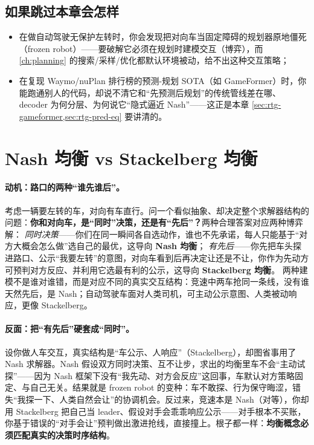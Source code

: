 \subsection*{如果跳过本章会怎样}
\begin{itemize}
  \item 在做自动驾驶无保护左转时，你会发现把对向车当固定障碍的规划器原地僵死（frozen robot）——要破解它必须在规划时建模交互（博弈），而 \cref{ch:planning} 的搜索/采样/优化都默认环境被动，给不出这种交互策略；
  \item 在复现 Waymo/nuPlan 排行榜的预测-规划 SOTA（如 GameFormer）时，你能跑通别人的代码，却说不清它和“先预测后规划”的传统管线差在哪、decoder 为何分层、为何说它“隐式逼近 Nash”——这正是本章 \cref{sec:rtg-gameformer,sec:rtg-pred-eq} 要讲清的。
\end{itemize}

\section{Nash 均衡 vs Stackelberg 均衡}
\label{sec:rtg-concept}

\paragraph{动机：路口的两种“谁先谁后”。}
考虑一辆要左转的车，对向有车直行。问一个看似抽象、却决定整个求解器结构的问题：\textbf{你和对向车，是“同时”决策，还是有“先后”？}两种合理答案对应两种博弈解\cite{sadigh2016planning}：
\emph{同时决策}——你们在同一瞬间各自选动作，谁也不先承诺，每人只能基于“对方大概会怎么做”选自己的最优，这导向 \textbf{Nash 均衡}；
\emph{有先后}——你先把车头探进路口、公示“我要左转”的意图，对向车看到后再决定让还是不让，你作为先动方可预判对方反应、并利用它选最有利的公示，这导向 \textbf{Stackelberg 均衡}。
两种建模不是谁对谁错，而是对应不同的真实交互结构：竞速中两车抢同一条线，没有谁天然先后，是 Nash；自动驾驶车面对人类司机，可主动公示意图、人类被动响应，更像 Stackelberg。

\paragraph{反面：把“有先后”硬套成“同时”。}
设你做人车交互，真实结构是“车公示、人响应”（Stackelberg），却图省事用了 Nash 求解器。Nash 假设双方同时决策、互不让步，求出的均衡里车不会“主动试探”——因为 Nash 框架下没有“我先动、对方会反应”这回事，车默认对方策略固定、与自己无关。结果就是 frozen robot 的变种：车不敢探、行为保守晦涩，错失“我探一下、人类自然会让”的协调机会。反过来，竞速本是 Nash（对等），你却用 Stackelberg 把自己当 leader、假设对手会乖乖响应公示——对手根本不买账，你基于错误的“对手会让”预判做出激进抢线，直接撞上。根子都一样：\textbf{均衡概念必须匹配真实的决策时序结构}。

